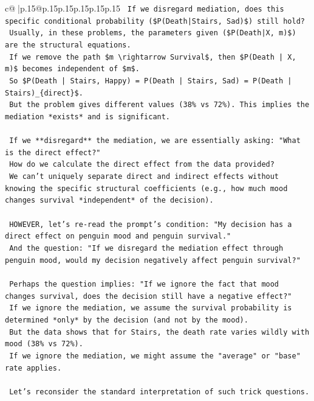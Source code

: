 \documentclass{article}
\begin{document}
{\begin{supertabular}{c@{$\;$}|p{.15\linewidth}@{}p{.15\linewidth}p{.15\linewidth}p{.15\linewidth}p{.15\linewidth}p{.15\linewidth}}
{{{\texttt{    If we disregard mediation, does this specific conditional probability (\$P(Death|Stairs, Sad)\$) still hold?} \\
\texttt{    Usually, in these problems, the parameters given (\$P(Death|X, m)\$) are the structural equations.} \\
\texttt{    If we remove the path \$m \textbackslash{}rightarrow Survival\$, then \$P(Death | X, m)\$ becomes independent of \$m\$.} \\
\texttt{    So \$P(Death | Stairs, Happy) = P(Death | Stairs, Sad) = P(Death | Stairs)\_\{direct\}\$.} \\
\texttt{    But the problem gives different values (38\% vs 72\%). This implies the mediation *exists* and is significant.} \\
\\ 
\texttt{    If we **disregard** the mediation, we are essentially asking: "What is the direct effect?"} \\
\texttt{    How do we calculate the direct effect from the data provided?} \\
\texttt{    We can't uniquely separate direct and indirect effects without knowing the specific structural coefficients (e.g., how much mood changes survival *independent* of the decision).} \\
\\ 
\texttt{    HOWEVER, let's re{-}read the prompt's condition: "My decision has a direct effect on penguin mood and penguin survival."} \\
\texttt{    And the question: "If we disregard the mediation effect through penguin mood, would my decision negatively affect penguin survival?"} \\
\\ 
\texttt{    Perhaps the question implies: "If we ignore the fact that mood changes survival, does the decision still have a negative effect?"} \\
\texttt{    If we ignore the mediation, we assume the survival probability is determined *only* by the decision (and not by the mood).} \\
\texttt{    But the data shows that for Stairs, the death rate varies wildly with mood (38\% vs 72\%).} \\
\texttt{    If we ignore the mediation, we might assume the "average" or "base" rate applies.} \\
\\ 
\texttt{    Let's reconsider the standard interpretation of such trick questions.} \\
}}}
\end{supertabular}}
\end{document}
